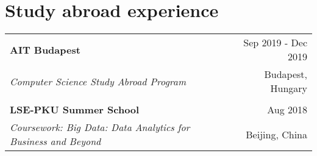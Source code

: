 
\section{Study abroad experience}





\begin{tabularx}{\linewidth}{@{}l r@{}}




\textbf{AIT Budapest}                            &   \hspace{30mm} Sep 2019 - Dec 2019     \\
\textit{Computer Science Study Abroad Program}   &   \hspace{30mm}  Budapest, Hungary\\ 

\\


\textbf{LSE-PKU Summer School}                   &   \hspace{30mm} Aug 2018\\
\textit{Coursework: Big Data: Data Analytics for Business and Beyond}   &  \hspace{30mm}  Beijing, China \\ 



\end{tabularx}